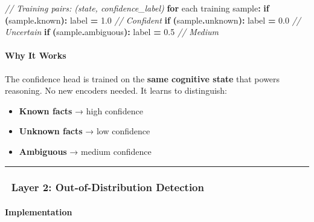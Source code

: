 \documentclass[
  11pt,
  a4paper,
]{article}
\newenvironment{Shaded}{\begin{snugshade}}{\end{snugshade}}
\newcommand{\CommentTok}[1]{\textcolor[rgb]{0.56,0.35,0.01}{\textit{#1}}}
\newcommand{\ControlFlowTok}[1]{\textcolor[rgb]{0.13,0.29,0.53}{\textbf{#1}}}
\newcommand{\FloatTok}[1]{\textcolor[rgb]{0.00,0.00,0.81}{#1}}
\newcommand{\NormalTok}[1]{#1}
\newcommand{\OperatorTok}[1]{\textcolor[rgb]{0.81,0.36,0.00}{\textbf{#1}}}
\providecommand{\tightlist}{%
  \setlength{\itemsep}{0pt}\setlength{\parskip}{0pt}}
\begin{document}
\begin{Shaded}
\begin{Highlighting}[]
\CommentTok{// Training pairs: (state, confidence\_label)}
\ControlFlowTok{for}\NormalTok{ each training sample}\OperatorTok{:}
    \ControlFlowTok{if} \OperatorTok{(}\NormalTok{sample}\OperatorTok{.}\NormalTok{known}\OperatorTok{):}\NormalTok{       label }\OperatorTok{=} \FloatTok{1.0}  \CommentTok{// Confident}
    \ControlFlowTok{if} \OperatorTok{(}\NormalTok{sample}\OperatorTok{.}\NormalTok{unknown}\OperatorTok{):}\NormalTok{     label }\OperatorTok{=} \FloatTok{0.0}  \CommentTok{// Uncertain}
    \ControlFlowTok{if} \OperatorTok{(}\NormalTok{sample}\OperatorTok{.}\NormalTok{ambiguous}\OperatorTok{):}\NormalTok{   label }\OperatorTok{=} \FloatTok{0.5}  \CommentTok{// Medium}
\end{Highlighting}
\end{Shaded}

\paragraph{Why It Works}\label{why-it-works}

The confidence head is trained on the \textbf{same cognitive state} that
powers reasoning. No new encoders needed. It learns to distinguish:

\begin{itemize}
\tightlist
\item
  \textbf{Known facts} → high confidence
\item
  \textbf{Unknown facts} → low confidence
\item
  \textbf{Ambiguous} → medium confidence
\end{itemize}

\begin{center}\rule{0.5\linewidth}{0.5pt}\end{center}

\subsubsection{🧩 Layer 2: Out-of-Distribution
Detection}\label{layer-2-out-of-distribution-detection}

\paragraph{Implementation}\label{implementation-2}
\end{document}
